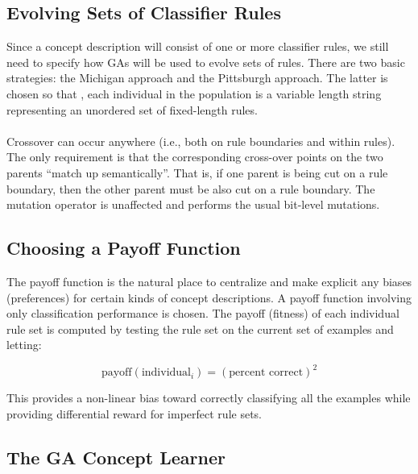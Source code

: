 \documentclass[../main.tex]{subfiles}
\begin{document}
\subsection{Evolving Sets of Classifier Rules}
Since a concept description will consist of one or more classifier rules, we still need to specify how GAs will be used
to evolve sets of rules. There are two basic strategies: the Michigan approach and the Pittsburgh approach. The latter
is chosen so that , each individual in the population is a variable length string representing an unordered set of
fixed-length rules.
\\\\
Crossover can occur anywhere (i.e., both on rule boundaries and within rules). The only requirement is that the
corresponding cross-over points on the two parents ``match up semantically''. That is, if one parent is being cut on a
rule boundary, then the other parent must be also cut on a rule boundary. The mutation operator is unaffected and
performs the usual bit-level mutations.

\subsection{Choosing a Payoff Function}
The payoff function is the natural place to centralize and make explicit any biases (preferences) for certain kinds of
concept descriptions. A payoff function involving only classification performance is chosen. The payoff (fitness) of
each individual rule set is computed by testing the rule set on the current set of examples and letting:

\begin{equation}
	\text{payoff}(\text{individual}_i) = (\text{percent correct})^2
\end{equation}

This provides a non-linear bias toward correctly classifying all the examples while providing differential reward for
imperfect rule sets.

\subsection{The GA Concept Learner}
\end{document}

